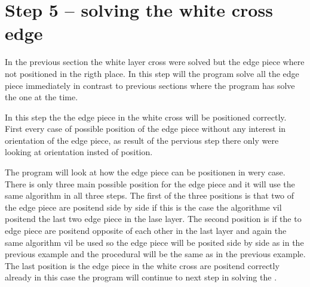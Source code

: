 \section{Step 5 -- solving the white cross edge}
In the previous section the white layer cross were solved but the edge piece where not positioned in the rigth place. In this step will the program solve all the edge piece immediately in contrast to previous sections where the program has solve the \cpiece{} one at the time. 

In this step the the edge piece in the white cross will be positioned correctly. First every case of possible position of the edge piece without any interest in orientation of the edge piece, as result of the pervious step there only were looking at orientation insted of position. 

The program will look at how the edge piece can be positionen in wery case. There is only three main possible position for the edge piece and it will use the same algorithm in all three steps. 
The first of the three positions is that two of the edge piece are positend side by side if this is the case the algorithme vil positend the last two edge piece in the lase layer. 
The second position is if the to edge piece are positend opposite of each other in the last layer and again the same algorithm vil be used so the edge piece will be posited side by side as in the previous example and the procedural will be the same as in the previous example. 
The last position is the edge piece in the white cross are positend correctly already in this case the program will continue to next step in solving the \rubik{}.

